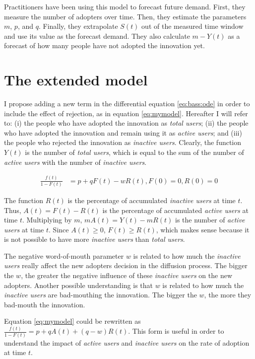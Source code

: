 Practitioners have been using this model to forecast future demand. First, they measure the number of adopters over time. Then, they estimate the parameters $m$, $p$, and $q$. Finally, they extrapolate $S(t)$ out of the measured time window and use its value as the forecast demand. They also calculate $m - Y(t)$ as a forecast of how many people have not adopted the innovation yet.


\chapter{The extended model}

I propose adding a new term in the differential equation \ref{eq:bass:ode} in order to include the effect of rejection, as in equation \ref{eq:mymodel}. Hereafter I will refer to: (i) the people who have adopted the innovation as \textit{total users}; (ii) the people who have adopted the innovation and remain using it as \textit{active users}; and (iii) the people who rejected the innovation as \textit{inactive users}. Clearly, the function $Y(t)$ is the number of \textit{total users}, which is equal to the sum of the number of \textit{active users} with the number of \textit{inactive users}.

\begin{align}
\frac{f(t)}{1-F(t)} &= p + qF(t) - wR(t), F(0)=0, R(0)=0 \label{eq:mymodel}
\end{align}

The function $R(t)$ is the percentage of accumulated \textit{inactive users} at time $t$. Thus, $A(t) = F(t) - R(t)$ is the percentage of accumulated \textit{active users} at time $t$. Multiplying by $m$, $mA(t) = Y(t) - mR(t)$ is the number of \textit{active users} at time $t$. Since $A(t) \ge 0$, $F(t) \ge R(t)$, which makes sense because it is not possible to have more \textit{inactive users} than \textit{total users}.

The negative word-of-mouth parameter $w$ is related to how much the \textit{inactive users} really affect the new adopters decision in the diffusion process. The bigger the $w$, the greater the negative influence of these \textit{inactive users} on the new adopters. Another possible understanding is that $w$ is related to how much the \textit{inactive users} are bad-mouthing the innovation. The bigger the $w$, the more they bad-mouth the innovation.

Equation \ref{eq:mymodel} could be rewritten as $\frac{f(t)}{1-F(t)} = p + qA(t) + (q-w)R(t)$. This form is useful in order to understand the impact of \textit{active users} and \textit{inactive users} on the rate of adoption at time $t$.


